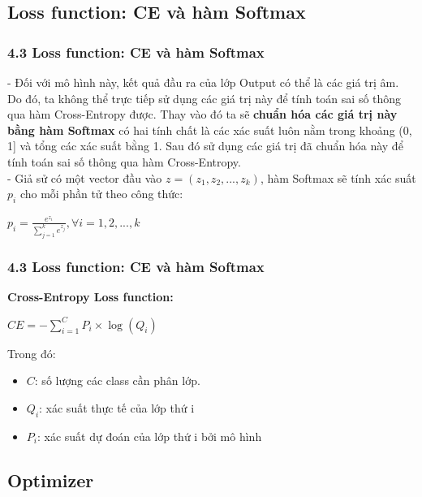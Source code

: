 \documentclass{beamer}
\begin{document}
\subsection{Loss function: CE và hàm Softmax} 

\begin{frame}
\frametitle{4.3 Loss function: CE và hàm Softmax}
- Đối với mô hình này, kết quả đầu ra của lớp Output có thể là các giá trị âm. Do đó, ta không thể trực tiếp sử dụng các giá trị này để tính toán sai số thông qua hàm Cross-Entropy được. Thay vào đó ta sẽ \textbf{chuẩn hóa các giá trị này bằng hàm Softmax} có hai tính chất là các xác suất luôn nằm trong khoảng (0, 1] và tổng các xác suất bằng 1. Sau đó sử dụng các giá trị đã chuẩn hóa này để tính toán sai số thông qua hàm Cross-Entropy. 
\\- Giả sử có một vector đầu vào $z = (z_1, z_2, ..., z_k)$, hàm Softmax sẽ tính xác suất $p_i$ cho mỗi phần tử theo công thức:
\begin{center}
    \Large $p_{i}=\frac{e^{z_{i}}}{\sum_{j=1}^{k}e^{z_{j}}},\forall i=1,2,...,k$
\end{center}
\end{frame}

\begin{frame}
\frametitle{4.3 Loss function: CE và hàm Softmax}
\textbf{Cross-Entropy Loss function:}
    \begin{center}
        \large $CE = - \sum_{i=1}^{C} P_{i}\times \log(Q_{i})$
    \end{center}
    Trong đó:
    \begin{itemize}
        \item $C$: số lượng các class cần phân lớp.
        \item $Q_{i}$: xác suất thực tế của lớp thứ i
        \item $P_{i}$: xác suất dự đoán của lớp thứ i bởi mô hình
    \end{itemize}
\end{frame}

\subsection{Optimizer} 
\end{document}
